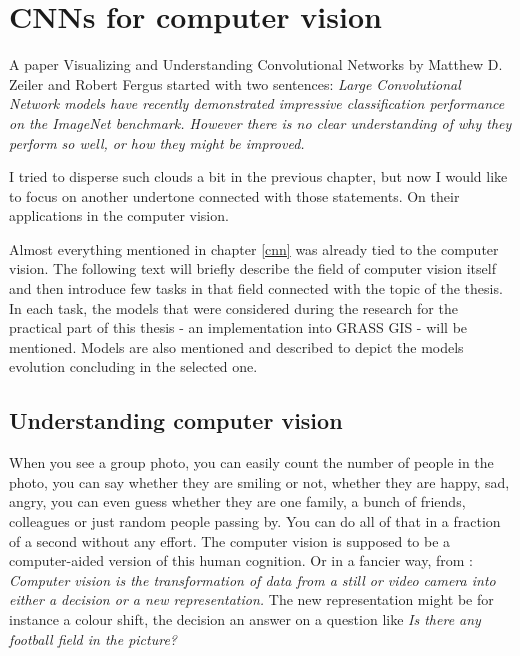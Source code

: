 \chapter{CNNs for computer vision}
\label{image-ann}

A paper Visualizing and Understanding Convolutional Networks by Matthew D. 
Zeiler and Robert Fergus \cite{zf-net} started with two sentences: \textit{Large 
Convolutional Network models have recently demonstrated impressive 
classification performance on the ImageNet benchmark. However there is no clear 
understanding of why they perform so well, or how they might be improved.}

I tried to disperse such clouds a bit in the previous chapter, but now I would 
like to focus on another undertone connected with those statements. On their 
applications in the computer vision.

Almost everything mentioned in chapter \ref{cnn} was already tied to the 
computer vision. The following text will briefly describe the field of computer 
vision itself and then introduce few tasks in that field connected with the 
topic of the thesis. In each task, the models that were considered during the 
research for the practical part of this thesis - an implementation into GRASS 
GIS - will be mentioned. Models are also mentioned and described to depict the 
models evolution concluding in the selected one.


\section{Understanding computer vision}
\label{computer-vision}

When you see a group photo, you can easily count the number of people in the 
photo, you can say whether they are smiling or not, whether they are happy, sad, 
angry, you can even guess whether they are one family, a bunch of friends, 
colleagues or just random people passing by. You can do all of that in a 
fraction of a second without any effort. The computer vision is supposed to be a 
computer-aided version of this human cognition. Or in a fancier way, from 
\cite{opencv}: \textit{Computer vision is the transformation of data from a 
still or video camera into either a decision or a new representation.} The new 
representation might be for instance a colour shift, the decision an answer on a 
question like \textit{Is there any football field in the picture?}

